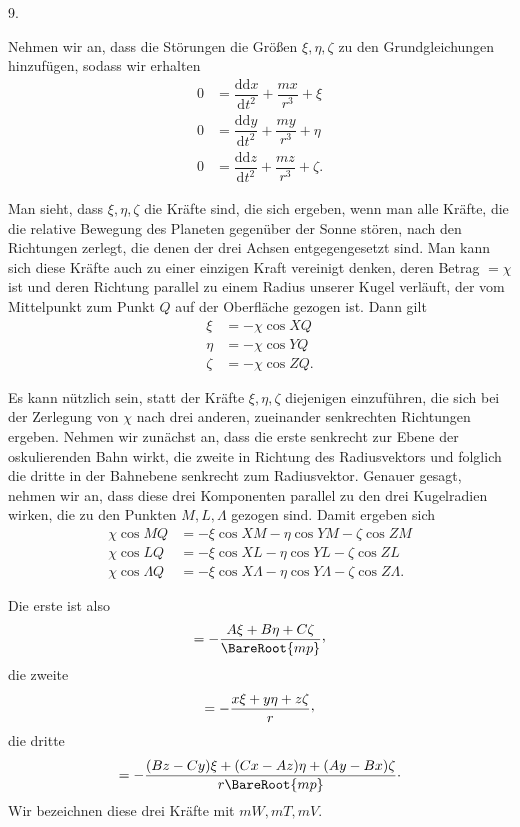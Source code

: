 \par{}\bigskip
{}
\begin{center}9.\end{center}
\noindent\hspace*{\parindent}Nehmen wir an, dass die Störungen die Größen \(\xi,\eta,\zeta\) zu den Grundgleichungen hinzufügen, sodass wir erhalten
\[
\begin{aligned}
0&=\dfrac{\mathrm{dd}x}{\mathrm{d}t^2}+\dfrac{mx}{r^3}+\xi\\[5pt]
0&=\dfrac{\mathrm{dd}y}{\mathrm{d}t^2}+\dfrac{my}{r^3}+\eta\\[5pt]
0&=\dfrac{\mathrm{dd}z}{\mathrm{d}t^2}+\dfrac{mz}{r^3}+\zeta.
\end{aligned}
\]
\par Man sieht, dass \(\xi,\eta,\zeta\) die Kräfte sind, die sich ergeben, wenn man alle Kräfte, die die relative Bewegung des Planeten gegenüber der Sonne stören, nach den Richtungen zerlegt, die denen der drei Achsen entgegengesetzt sind. Man kann sich diese Kräfte auch zu einer einzigen Kraft vereinigt denken, deren Betrag \(=\chi\) ist und deren Richtung parallel zu einem Radius unserer Kugel verläuft, der vom Mittelpunkt zum Punkt \(Q\) auf der Oberfläche gezogen ist. Dann gilt
\[
\begin{aligned}
\xi&=-\chi\cos XQ\\
\eta&=-\chi\cos YQ\\
\zeta&=-\chi\cos ZQ.
\end{aligned}
\]
\par Es kann nützlich sein, statt der Kräfte \(\xi,\eta,\zeta\) diejenigen einzuführen, die sich bei der Zerlegung von \(\chi\) nach drei anderen, zueinander senkrechten Richtungen ergeben. Nehmen wir zunächst an, dass die erste senkrecht zur Ebene der oskulierenden Bahn wirkt, die zweite in Richtung des Radiusvektors und folglich die dritte in der Bahnebene senkrecht zum Radiusvektor. Genauer gesagt, nehmen wir an, dass diese drei Komponenten parallel zu den drei Kugelradien wirken, die zu den Punkten \(M,L,\Lambda\) gezogen sind. Damit ergeben sich
\[
\begin{aligned}
\chi\cos MQ&=-\xi\cos XM-\eta\cos YM-\zeta\cos ZM\\
\chi\cos LQ&=-\xi\cos XL-\eta\cos YL-\zeta\cos ZL\\
\chi\cos\Lambda Q&=-\xi\cos X\Lambda-\eta\cos Y\Lambda-\zeta\cos Z\Lambda.
\end{aligned}
\]
\par Die erste ist also
\[
=-\dfrac{A\xi+B\eta+C\zeta}{\BareRoot{mp}}\mathpunct{\raisebox{.45ex}{,}}
\]
die zweite
\[
=-\dfrac{x\xi+y\eta+z\zeta}{r}\mathpunct{\raisebox{.45ex}{,}}
\]
die dritte
\[
=-\dfrac{(Bz-Cy)\xi+(Cx-Az)\eta+(Ay-Bx)\zeta}{r\BareRoot{mp}}\mathpunct{\cdot}
\]
Wir bezeichnen diese drei Kräfte mit \(mW,mT,mV\).
